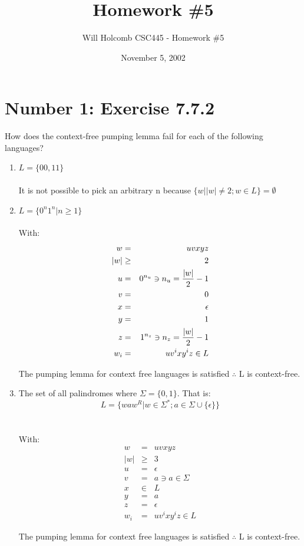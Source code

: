 \documentclass[12pt,a4paper,twoside]{article}  %
\author{Will Holcomb \small{CSC445 - Homework \#5}}
\title{Homework \#5}
\date{November 5, 2002}
\begin{document}
\maketitle

\section{Number 1: Exercise 7.7.2}

How does the context-free pumping lemma fail for each of the following languages?

\begin{enumerate}

\item $L = \{00, 11\}$
\\\\
It is not possible to pick an arbitrary n because
  $\{w | |w| \not = 2; w \in L\} = \emptyset$

\item $L = \{0^n1^n | n \geq 1\}$
\\\\
With:
\begin{eqnarray}
w &=& uvxyz \\
|w| &\geq& 2 \\
u &=& 0^{n_u} \ni n_u = {|w|\over2} - 1 \\
v &=& 0 \\
x &=& \epsilon \\
y &=& 1 \\
z &=& 1^{n_z} \ni n_z = {|w|\over2} - 1 \\
w_i &=& uv^ixy^iz \in L
\end{eqnarray}

The pumping lemma for context free languages is satisfied $\therefore$
L is context-free.

\item The set of all palindromes where $\Sigma = \{0, 1\}$. That is:
\begin{equation}
L = \{waw^R | w \in \Sigma^*; a \in \Sigma \cup \{\epsilon\}\}
\end{equation}
\\\\
With:
\begin{eqnarray}
w &=& uvxyz \\
|w| &\geq& 3 \\
u &=& \epsilon \\
v &=& a \ni a \in \Sigma \\
x &\in& L \\
y &=& a \\
z &=& \epsilon \\
w_i &=& uv^ixy^iz \in L
\end{eqnarray}

The pumping lemma for context free languages is satisfied $\therefore$
L is context-free.

\end{enumerate}
\end{document}
